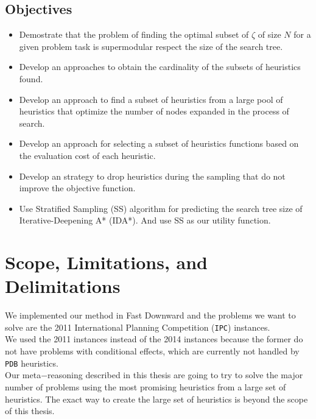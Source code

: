 \subsection{Objectives}
\noindent

\begin{itemize}
  \item Demostrate that the problem of finding the optimal subset of $\zeta$ of size $N$ for a given problem task is supermodular respect the size of the search tree.

  \item Develop an approaches to obtain the cardinality of the subsets of heuristics found.
  
  \item Develop an approach to find a subset of heuristics from a large pool of heuristics that optimize the number of nodes expanded in the process of search.
  
  \item Develop an approach for selecting a subset of heuristics functions based on the evaluation cost of each heuristic.
  
  \item Develop an strategy to drop heuristics during the sampling that do not improve the objective function.  
  
  \item Use Stratified Sampling (SS) algorithm for predicting the search tree size of Iterative-Deepening A* (IDA*). And use SS as our utility function.
   
\end{itemize}
\section{Scope, Limitations, and Delimitations}
\noindent
We implemented our method in Fast Downward \cite{helmert2006fast} and the problems we want to solve are the 2011 International Planning Competition (\texttt{IPC}) instances.\\

We used the 2011 instances instead of the 2014 instances because the former do not have problems with conditional effects, which are currently not handled by \texttt{PDB} heuristics.\\

Our meta$-$reasoning described in this thesis are going to try to solve the major number of problems using the most promising heuristics from a large set of heuristics. The exact way to create the large set of heuristics is beyond the scope of this thesis.

